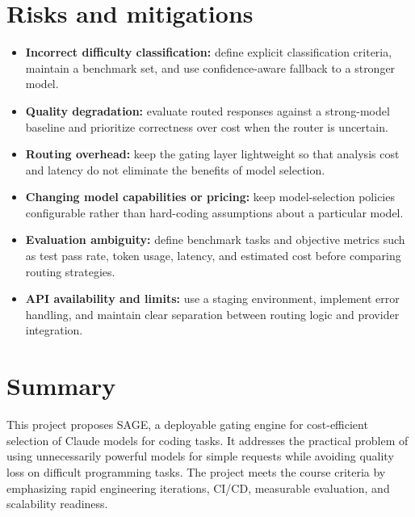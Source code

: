 \documentclass[11pt,a4paper]{article}
\begin{document}
\section{Risks and mitigations}

\begin{itemize}[leftmargin=0.7cm]

    \item \textbf{Incorrect difficulty classification:}
    define explicit classification criteria, maintain a
    benchmark set, and use confidence-aware fallback to a
    stronger model.

    \item \textbf{Quality degradation:} evaluate routed
    responses against a strong-model baseline and prioritize
    correctness over cost when the router is uncertain.

    \item \textbf{Routing overhead:} keep the gating layer
    lightweight so that analysis cost and latency do not
    eliminate the benefits of model selection.

    \item \textbf{Changing model capabilities or pricing:}
    keep model-selection policies configurable rather than
    hard-coding assumptions about a particular model.

    \item \textbf{Evaluation ambiguity:} define benchmark
    tasks and objective metrics such as test pass rate,
    token usage, latency, and estimated cost before
    comparing routing strategies.

    \item \textbf{API availability and limits:} use a staging
    environment, implement error handling, and maintain
    clear separation between routing logic and provider
    integration.

\end{itemize}

\section{Summary}

This project proposes SAGE, a deployable gating engine for
cost-efficient selection of Claude models for coding tasks.
It addresses the practical problem of using unnecessarily
powerful models for simple requests while avoiding quality
loss on difficult programming tasks. The project meets the
course criteria by emphasizing rapid engineering iterations,
CI/CD, measurable evaluation, and scalability readiness.
\end{document}
